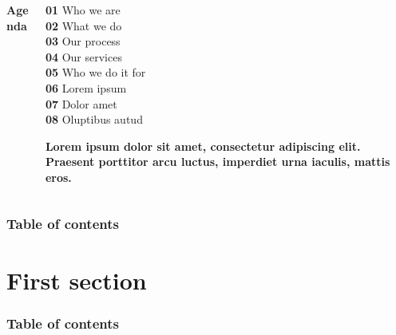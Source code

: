 \documentclass[
	aspectratio=169, %
	t, %
	onlytextwidth, %
	10pt, %
]{beamer}
\begin{document}
	\begin{frame}
		\begin{columns}[T] %
			\begin{column}{0.48\linewidth} %
				\HUGE\textbf{Agenda}
			\end{column}
			\begin{column}{0.48\linewidth} %
				\textbf{01} Who we are\\ %
				\textbf{02} What we do\\
				\textbf{03} Our process\\
				\textbf{04} Our services\\
				\textbf{05} Who we do it for\\
				\textbf{06} Lorem ipsum\\
				\textbf{07} Dolor amet\\
				\textbf{08} Oluptibus autud
				
				\textbf{Lorem ipsum dolor sit amet, consectetur adipiscing elit. Praesent porttitor arcu luctus, imperdiet urna iaculis, mattis eros.}
			\end{column}
		\end{columns}
	\end{frame}
\endgroup


\begin{frame}
    \frametitle{Table of contents}
    \tableofcontents
\end{frame}



\section{First section}

\begin{frame}
    \frametitle{Table of contents}
    \tableofcontents[currentsection]
\end{frame}
\end{document}
